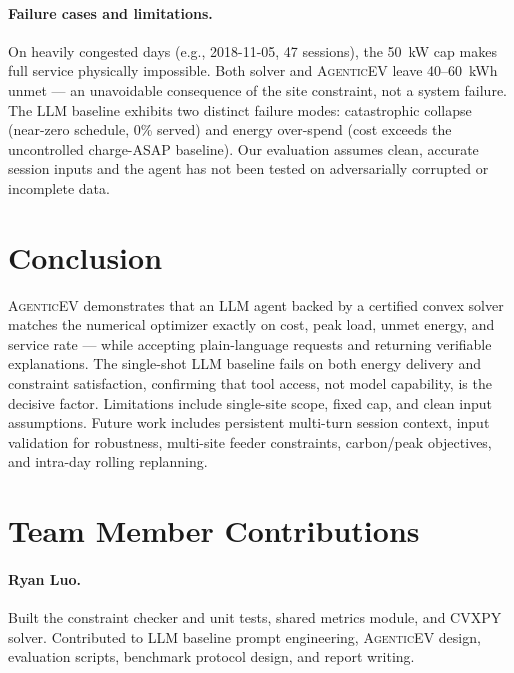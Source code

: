 \documentclass{article}
\newcommand{\modelname}{\textsc{AgenticEV}}
\begin{document}
\paragraph{Failure cases and limitations.}
On heavily congested days (e.g., 2018-11-05, 47 sessions), the 50~kW cap makes full service physically impossible. Both solver and \modelname{} leave 40--60~kWh unmet — an unavoidable consequence of the site constraint, not a system failure. The LLM baseline exhibits two distinct failure modes: catastrophic collapse (near-zero schedule, 0\% served) and energy over-spend (cost exceeds the uncontrolled charge-ASAP baseline). Our evaluation assumes clean, accurate session inputs and the agent has not been tested on adversarially corrupted or incomplete data.

\section{Conclusion}

\modelname{} demonstrates that an LLM agent backed by a certified convex solver matches the numerical optimizer exactly on cost, peak load, unmet energy, and service rate — while accepting plain-language requests and returning verifiable explanations. The single-shot LLM baseline fails on both energy delivery and constraint satisfaction, confirming that tool access, not model capability, is the decisive factor. Limitations include single-site scope, fixed cap, and clean input assumptions. Future work includes persistent multi-turn session context, input validation for robustness, multi-site feeder constraints, carbon/peak objectives, and intra-day rolling replanning.

\clearpage
\section{Team Member Contributions}

\paragraph{Ryan Luo.}
Built the constraint checker and unit tests, shared metrics module, and CVXPY solver. Contributed to LLM baseline prompt engineering, \modelname{} design, evaluation scripts, benchmark protocol design, and report writing.
\end{document}
